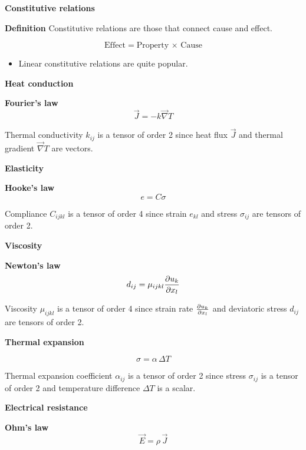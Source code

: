 {\bf Constitutive relations}

{\bf Definition}
Constitutive relations are those that connect cause and effect.

$$ \text{Effect} = \text{Property} \, \times \, \text{Cause} $$

\begin{itemize}
\item Linear constitutive relations are quite popular.
\end{itemize}


{\bf Heat conduction}

{\bf Fourier's law}
$$\vec{J} = -k \vec{\nabla}T$$

Thermal conductivity $k_{ij}$ is a tensor of order 2 since heat flux $\vec{J}$ and thermal gradient $\vec{\nabla} T$ are vectors.



{\bf Elasticity}

{\bf Hooke's law}
$$ e = C \sigma $$

Compliance $C_{ijkl}$ is a tensor of order 4 since strain $e_{kl}$ and stress $\sigma_{ij}$ are tensors of order 2.



{\bf Viscosity}

{\bf Newton's law}
$$ d_{ij} = \mu_{ijkl} {\partial u_k \over \partial x_l} $$

Viscosity $\mu_{ijkl}$ is a tensor of order 4 since strain rate ${\partial u_k \over \partial x_l}$ and deviatoric stress $d_{ij}$ are tensors of order 2.



{\bf Thermal expansion}

$$ \sigma = \alpha \, \Delta T $$

Thermal expansion coefficient $\alpha_{ij}$ is a tensor of order 2 since stress $\sigma_{ij}$ is a tensor of order 2 and temperature difference $\Delta T$ is a scalar.



{\bf Electrical resistance}

{\bf Ohm's law}
$$ \vec{E} = \rho \, \vec{J} $$

